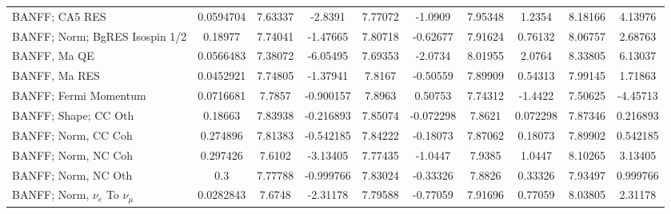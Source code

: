 \begin{tabular}{| l | S | S  S | S  S | S  S | S  S | }
                                                                  BANFF; CA5 RES &       0.0594704 &         7.63337 &         -2.8391 &         7.77072 &         -1.0909 &         7.95348 &          1.2354 &         8.18166 &         4.13976 \\ 
                                                  BANFF; Norm; BgRES Isospin 1/2 &         0.18977 &         7.74041 &        -1.47665 &         7.80718 &        -0.62677 &         7.91624 &         0.76132 &         8.06757 &         2.68763 \\ 
                                                                    BANFF, Ma QE &       0.0566483 &         7.38072 &        -6.05495 &         7.69353 &         -2.0734 &         8.01955 &          2.0764 &         8.33805 &         6.13037 \\ 
                                                                   BANFF, Ma RES &       0.0452921 &         7.74805 &        -1.37941 &          7.8167 &        -0.50559 &         7.89909 &         0.54313 &         7.99145 &         1.71863 \\ 
                                                           BANFF; Fermi Momentum &       0.0716681 &          7.7857 &       -0.900157 &          7.8963 &         0.50753 &         7.74312 &         -1.4422 &         7.50625 &        -4.45713 \\ 
                                                            BANFF; Shape; CC Oth &         0.18663 &         7.83938 &       -0.216893 &         7.85074 &       -0.072298 &          7.8621 &        0.072298 &         7.87346 &        0.216893 \\ 
                                                             BANFF; Norm, CC Coh &        0.274896 &         7.81383 &       -0.542185 &         7.84222 &        -0.18073 &         7.87062 &         0.18073 &         7.89902 &        0.542185 \\ 
                                                             BANFF; Norm, NC Coh &        0.297426 &          7.6102 &        -3.13405 &         7.77435 &         -1.0447 &          7.9385 &          1.0447 &         8.10265 &         3.13405 \\ 
                                                             BANFF; Norm, NC Oth &             0.3 &         7.77788 &       -0.999766 &         7.83024 &        -0.33326 &          7.8826 &         0.33326 &         7.93497 &        0.999766 \\ 
                                           BANFF; Norm, $\nu_{e}$ To $\nu_{\mu}$ &       0.0282843 &          7.6748 &        -2.31178 &         7.79588 &        -0.77059 &         7.91696 &         0.77059 &         8.03805 &         2.31178 \\ 

\end{tabular}
